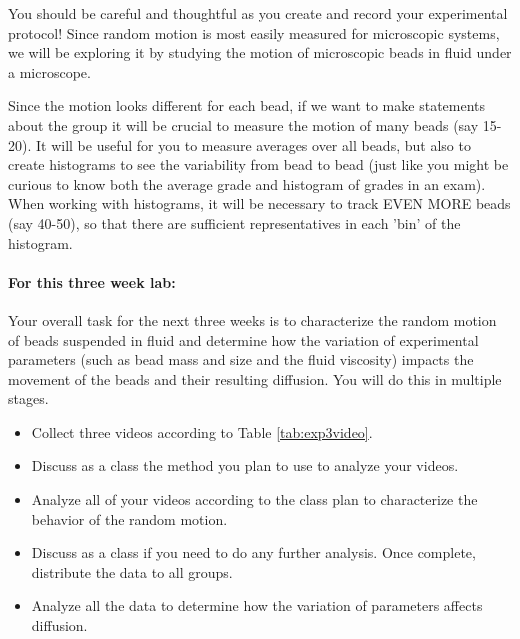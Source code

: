 You should be careful and thoughtful as you create and record your experimental protocol!
Since random motion is most easily measured for microscopic systems, we will be exploring it by studying the motion of microscopic beads in fluid under a microscope.
\par
Since the motion looks different for each bead, if we want to make statements about the group it will be crucial to measure the motion of many beads (say 15-20).
It will be useful for you to measure averages over all beads, but also to create histograms to see the variability from bead to bead (just like you might be curious to know both the average grade and histogram of grades in an exam).
When working with histograms, it will be necessary to track EVEN MORE beads (say 40-50), so that there are sufficient representatives in each 'bin' of the histogram.

\paragraph{For this three week lab:}Your overall task for the next three weeks is to characterize the random motion of beads suspended in fluid and determine how the variation of experimental parameters (such as bead mass and size and the fluid viscosity) impacts the movement of the beads and their resulting diffusion.
You will do this in multiple stages.
\begin{itemize}
\item Collect three videos according to Table \ref{tab:exp3video}.
\item Discuss as a class the method you plan to use to analyze your videos.
\item Analyze all of your videos according to the class plan to characterize the behavior of the random motion.
\item Discuss as a class if you need to do any further analysis. Once complete, distribute the data to all groups.
\item Analyze all the data to determine how the variation of parameters affects diffusion.
\end{itemize}

